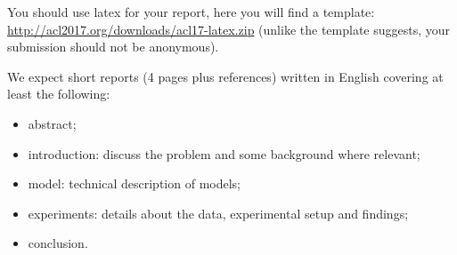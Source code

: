 You should use latex for your report, here you will find a template: \url{http://acl2017.org/downloads/acl17-latex.zip} (unlike the template suggests, your submission should not be anonymous). 

We expect short reports (4 pages plus references) written in English covering at least the following:
\begin{itemize}
	\item abstract;
	\item introduction: discuss the problem and some background where relevant;
	\item model: technical description of models;
	\item experiments: details about the data, experimental setup and findings;
	\item conclusion.
\end{itemize}

